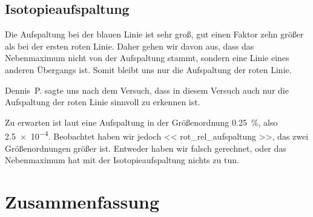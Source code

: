\subsection{Isotopieaufspaltung}

Die Aufspaltung bei der blauen Linie ist sehr groß, gut einen Faktor zehn
größer als bei der ersten roten Linie. Daher gehen wir davon aus, dass das
Nebenmaximum nicht von der Aufspaltung stammt, sondern eine Linie eines anderen
Übergangs ist. Somit bleibt uns nur die Aufspaltung der roten Linie.

Dennis~P. sagte uns nach dem Versuch, dass in diesem Versuch auch nur die
Aufspaltung der roten Linie sinnvoll zu erkennen ist.

Zu erwarten ist laut \cite{PHManual/atomic} eine Aufspaltung in der
Größenordnung \SI{0.25}{\percent}, also \num{2.5e-4}. Beobachtet haben wir
jedoch \num{<< rot_rel_aufspaltung >>}, das zwei Größenordnungen größer ist.
Entweder haben wir falsch gerechnet, oder das Nebenmaximum hat mit der
Isotopieaufspaltung nichts zu tun.


\FloatBarrier
\section{Zusammenfassung}

\fehlt



